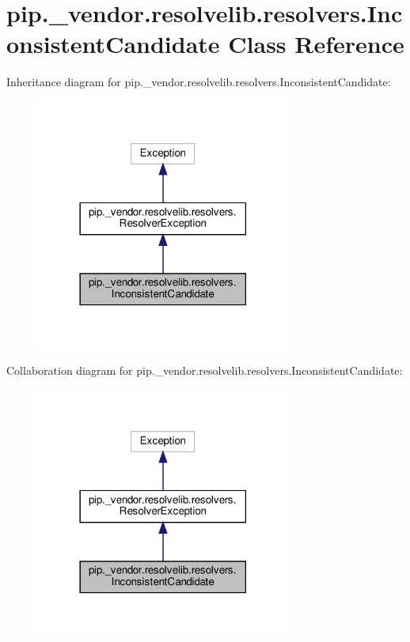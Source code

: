 \hypertarget{classpip_1_1__vendor_1_1resolvelib_1_1resolvers_1_1InconsistentCandidate}{}\section{pip.\+\_\+vendor.\+resolvelib.\+resolvers.\+Inconsistent\+Candidate Class Reference}
\label{classpip_1_1__vendor_1_1resolvelib_1_1resolvers_1_1InconsistentCandidate}


Inheritance diagram for pip.\+\_\+vendor.\+resolvelib.\+resolvers.\+Inconsistent\+Candidate\+:
\nopagebreak
\begin{figure}[H]
\begin{center}
\leavevmode
\includegraphics[width=237pt]{classpip_1_1__vendor_1_1resolvelib_1_1resolvers_1_1InconsistentCandidate__inherit__graph}
\end{center}
\end{figure}


Collaboration diagram for pip.\+\_\+vendor.\+resolvelib.\+resolvers.\+Inconsistent\+Candidate\+:
\nopagebreak
\begin{figure}[H]
\begin{center}
\leavevmode
\includegraphics[width=237pt]{classpip_1_1__vendor_1_1resolvelib_1_1resolvers_1_1InconsistentCandidate__coll__graph}
\end{center}
\end{figure}
